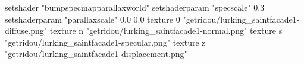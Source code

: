 setshader "bumpspecmapparallaxworld"
setshaderparam "specscale" 0.3
setshaderparam "parallaxscale" 0.0 0.0
texture 0 "getridou/lurking_saintfacade1-diffuse.png"
texture n "getridou/lurking_saintfacade1-normal.png"
texture s "getridou/lurking_saintfacade1-specular.png"
texture z "getridou/lurking_saintfacade1-displacement.png"